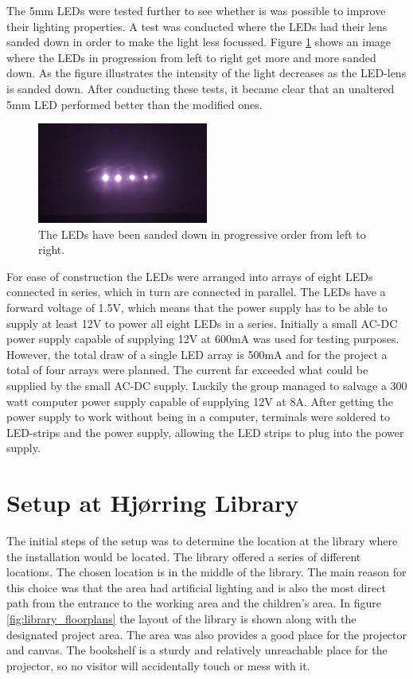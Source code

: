 The 5mm LEDs were tested further to see whether is was possible to improve their lighting properties. A test was conducted where the LEDs had their lens sanded down in order to make the light less focussed. Figure \ref{fig:leds_sanded} shows an image where the LEDs in progression from left to right get more and more sanded down. As the figure illustrates the intensity of the light decreases as the LED-lens is sanded down. After conducting these tests, it became clear that an unaltered 5mm LED performed better than the modified ones.

\begin{figure} [htbp]
\centering
\includegraphics[width=0.50\textwidth]{Pictures/Theory/sanded_leds.jpg}
\caption{The LEDs have been sanded down in progressive order from left to right.}
\label{fig:leds_sanded}
\end{figure}

For ease of construction the LEDs were arranged into arrays of eight LEDs connected in series, which in turn are connected in parallel. The LEDs have a forward voltage of 1.5V, which means that the power supply has to be able to supply at least 12V to power all eight LEDs in a series. Initially a small AC-DC power supply capable of supplying 12V at 600mA was used for testing purposes. However, the total draw of a single LED array is 500mA and for the project a total of four arrays were planned. The current far exceeded what could be supplied by the small AC-DC supply. Luckily the group managed to salvage a 300 watt computer power supply capable of supplying 12V at 8A. After getting the power supply to work without being in a computer, terminals were soldered to LED-strips and the power supply, allowing the LED strips to plug into the power supply.

\section{Setup at Hj{\o}rring Library}
The initial steps of the setup was to determine the location at the library where the installation would be located. The library offered a series of different locations. The chosen location is in the middle of the library. The main reason for this choice was that the area had artificial lighting and is also the most direct path from the entrance to the working area and the children's area. In figure \ref{fig:library_floorplans} the layout of the library is shown along with the designated project area. The area was also provides a good place for the projector and canvas. The bookshelf is a sturdy and relatively unreachable place for the projector, so no visitor will accidentally touch or mess with it.


